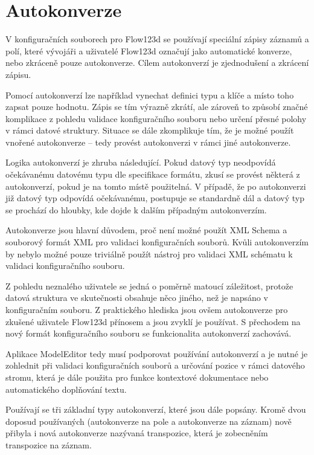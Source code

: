 \documentclass[FM,bw,DP]{tulthesis}
\begin{document}
\section{Autokonverze}

V konfiguračních souborech pro Flow123d se používají speciální zápisy záznamů a polí, které vývojáři a uživatelé Flow123d označují jako automatické konverze, nebo zkráceně pouze autokonverze. Cílem autokonverzí je zjednodušení a zkrácení zápisu.

Pomocí autokonverzí lze například vynechat definici typu a klíče a místo toho zapsat pouze hodnotu. Zápis se tím výrazně zkrátí, ale zároveň to způsobí značné komplikace z pohledu validace konfiguračního souboru nebo určení přesné polohy v rámci datové struktury. Situace se dále zkomplikuje tím, že je možné použít vnořené autokonverze -- tedy provést autokonverzi v rámci jiné autokonverze.

Logika autokonverzí je zhruba následující. Pokud datový typ neodpovídá očekávanému datovému typu dle specifikace formátu, zkusí se provést některá z autokonverzí, pokud je na tomto místě použitelná. V případě, že po autokonverzi již datový typ odpovídá očekávanému, postupuje se standardně dál a datový typ se prochází do hloubky, kde dojde k dalším případným autokonverzím.

Autokonverze jsou hlavní důvodem, proč není možné použít XML Schema a souborový formát XML pro validaci konfiguračních souborů. Kvůli autokonverzím by nebylo možné pouze triviálně použít nástroj pro validaci XML schématu k validaci konfiguračního souboru.

Z pohledu neznalého uživatele se jedná o poměrně matoucí záležitost, protože datová struktura ve skutečnosti obsahuje něco jiného, než je napsáno v konfiguračním souboru. Z praktického hlediska jsou ovšem autokonverze pro zkušené uživatele Flow123d přínosem a jsou zvyklí je používat. S přechodem na nový formát konfiguračního souboru se funkcionalita autokonverzí zachovává.

Aplikace ModelEditor tedy musí podporovat používání autokonverzí a je nutné je zohlednit při validaci konfiguračních souborů a určování pozice v rámci datového stromu, která je dále použita pro funkce kontextové dokumentace nebo automatického doplňování textu. 

Používají se tři základní typy autokonverzí, které jsou dále popsány. Kromě dvou doposud používaných (autokonverze na pole a autokonverze na záznam) nově přibyla i nová autokonverze nazývaná transpozice, která je zobecněním transpozice na záznam.
\end{document}
